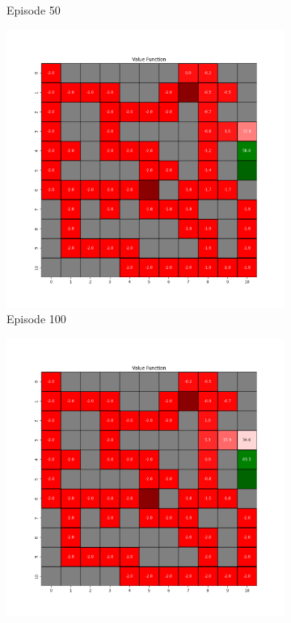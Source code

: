 \documentclass{assignment}
\begin{document}
\begin{figure}[H]
\begin{subfigure}{0.3\textwidth}
    \caption{Episode 50}
    \end{subfigure}\hfill
    \begin{subfigure}{0.3\textwidth}
        \includegraphics[width=\textwidth]{figures/value_q/gamma_sweep/value_function_alpha_0.1_gamma_0.5_epsilon_0.2_iteration_100.png}
    \caption{Episode 100}
    \end{subfigure}
    \begin{subfigure}{0.3\textwidth}
        \includegraphics[width=\textwidth]{figures/value_q/gamma_sweep/value_function_alpha_0.1_gamma_0.5_epsilon_0.2_iteration_1000.png}

\end{subfigure}
\end{figure}
\end{document}
